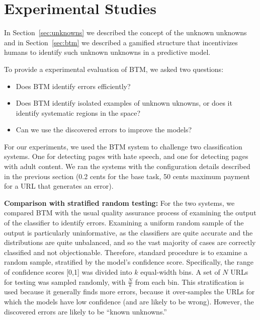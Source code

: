 \section{Experimental Studies}

In Section~\ref{sec:unknowns} we described the concept of the unknown unknowns and in Section~\ref{sec:btm} we described a gamified structure that incentivizes humans to identify such unknown unknowns in a predictive model.

To provide a experimental evaluation of BTM, we asked two questions:
\begin{itemize}

\item Does BTM identify errors efficiently?

\item Does BTM identify isolated examples of unknown uknowns, or does it identify systematic regions in the space?

\item Can we use the discovered errors to improve the models?

\end{itemize}

For our experiments, we used the BTM system to challenge two
classification systems. One for detecting pages with hate speech, and
one for detecting pages with adult content. We ran the systems with
the configuration details described in the previous section (0.2 cents
for the base task, 50 cents maximum payment for a URL that generates
an error).

\textbf{Comparison with stratified random testing:} For the two systems, we compared BTM with the usual quality assurance process of examining the output of the classifier to identify errors.  Examining a uniform random sample of the output is particularly uninformative, as the classifiers are quite accurate and the distributions are quite unbalanced, and so the vast majority of cases are correctly classified and not objectionable.  Therefore, standard procedure is to examine a random sample, stratified by the model's confidence score.  Specifically, the range of confidence scores [0,1] was divided into $k$ equal-width bins.  A set of $N$ URLs for testing was sampled randomly, with $\frac{N}{k}$ from each bin.  This stratification is used because it generally finds more errors, because it over-samples the URLs for which the models have low confidence (and are likely to be wrong).  However, the discovered errors are likely to be ``known unknowns.''  

